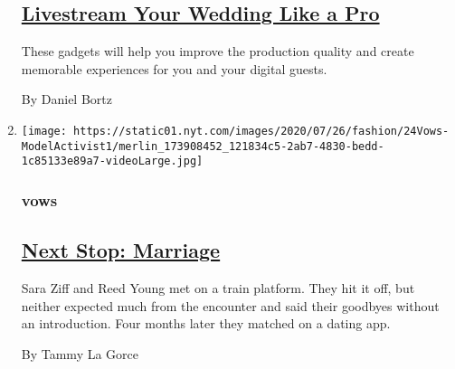 \begin{enumerate}
  \hypertarget{livestream-your-wedding-like-a-pro}{%
  \subsection{\texorpdfstring{\href{/2020/07/28/fashion/weddings/livestream-your-wedding-like-a-pro.html}{Livestream
  Your Wedding Like a
  Pro}}{Livestream Your Wedding Like a Pro}}\label{livestream-your-wedding-like-a-pro}}

  These gadgets will help you improve the production quality and create
  memorable experiences for you and your digital guests.

  By Daniel Bortz
\item
  \texttt{[image: https://static01.nyt.com/images/2020/07/26/fashion/24Vows-ModelActivist1/merlin\_173908452\_121834c5-2ab7-4830-bedd-1c85133e89a7-videoLarge.jpg]}

  \hypertarget{vows-1}{%
  \subsubsection{vows}\label{vows-1}}

  \hypertarget{next-stop-marriage}{%
  \subsection{\texorpdfstring{\href{/2020/07/24/fashion/weddings/Sara-Ziff-marries-Reed-Young-at-train-station.html}{Next
  Stop: Marriage}}{Next Stop: Marriage}}\label{next-stop-marriage}}

  Sara Ziff and Reed Young met on a train platform. They hit it off, but
  neither expected much from the encounter and said their goodbyes
  without an introduction. Four months later they matched on a dating
  app.

  By Tammy La Gorce
\end{enumerate}

